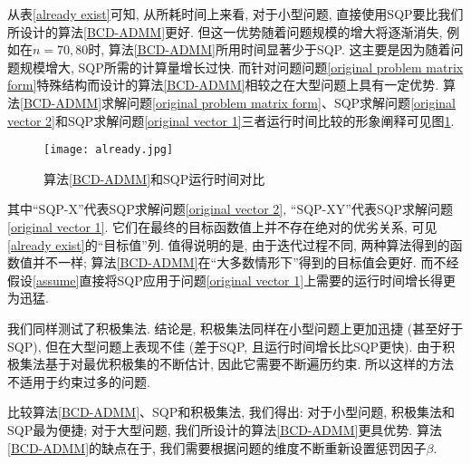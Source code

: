 \par 从表\ref{already exist}可知, 从所耗时间上来看, 对于小型问题, 直接使用SQP要比我们所设计的算法\ref{BCD-ADMM}更好. 但这一优势随着问题规模的增大将逐渐消失, 例如在$n=70,80$时, 算法\ref{BCD-ADMM}所用时间显著少于SQP. 这主要是因为随着问题规模增大, SQP所需的计算量增长过快. 而针对问题问题\eqref{original problem matrix form}特殊结构而设计的算法\ref{BCD-ADMM}相较之在大型问题上具有一定优势. 算法\ref{BCD-ADMM}求解问题\eqref{original problem matrix form}、SQP求解问题\eqref{original vector 2}和SQP求解问题\eqref{original vector 1}三者运行时间比较的形象阐释可见图\ref{time comparison}.
\begin{figure}[htbp]
	\renewcommand{\captionfont}{\small}
	\centering
	\texttt{[image: already.jpg]}
	\caption{算法\ref{BCD-ADMM}和SQP运行时间对比}
	\label{time comparison}
\end{figure}
其中``SQP-X''代表SQP求解问题\eqref{original vector 2}, ``SQP-XY''代表SQP求解问题\eqref{original vector 1}. 它们在最终的目标函数值上并不存在绝对的优劣关系, 可见\ref{already exist}的``目标值''列. 值得说明的是, 由于迭代过程不同, 两种算法得到的函数值并不一样; 算法\ref{BCD-ADMM}在``大多数情形下''得到的目标值会更好. 而不经假设\ref{assume}直接将SQP应用于问题\eqref{original vector 1}上需要的运行时间增长得更为迅猛. 
\par 我们同样测试了积极集法. 结论是, 积极集法同样在小型问题上更加迅捷 (甚至好于SQP), 但在大型问题上表现不佳 (差于SQP, 且运行时间增长比SQP更快). 由于积极集法基于对最优积极集的不断估计, 因此它需要不断遍历约束. 所以这样的方法不适用于约束过多的问题.
\par 比较算法\ref{BCD-ADMM}、SQP和积极集法, 我们得出: 对于小型问题, 积极集法和SQP最为便捷; 对于大型问题, 我们所设计的算法\ref{BCD-ADMM}更具优势. 算法\ref{BCD-ADMM}的缺点在于, 我们需要根据问题的维度不断重新设置惩罚因子$\beta$. 
